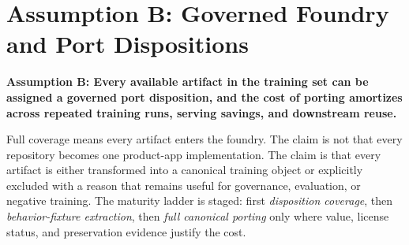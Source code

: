 \section{Assumption B: Governed Foundry and Port Dispositions}

\textbf{Assumption B: Every available artifact in the training set can be assigned a governed port disposition, and the cost of porting amortizes across repeated training runs, serving savings, and downstream reuse.}

Full coverage means every artifact enters the foundry. The claim is not that every repository becomes one product-app implementation. The claim is that every artifact is either transformed into a canonical training object or explicitly excluded with a reason that remains useful for governance, evaluation, or negative training. The maturity ladder is staged: first \emph{disposition coverage}, then \emph{behavior-fixture extraction}, then \emph{full canonical porting} only where value, license status, and preservation evidence justify the cost.

